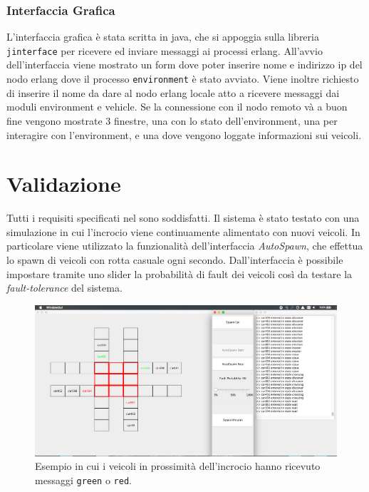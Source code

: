 \documentclass{memoir}
\begin{document}
\subsection{Interfaccia Grafica}
L'interfaccia grafica è stata scritta in java, che si appoggia sulla libreria \texttt{jinterface} per ricevere ed inviare messaggi ai processi erlang.
All'avvio dell'interfaccia viene mostrato un form dove poter inserire nome e indirizzo ip del nodo erlang dove il processo \texttt{environment} è stato avviato. Viene inoltre richiesto di inserire il nome da dare al nodo erlang locale atto a ricevere messaggi dai moduli environment e vehicle.
Se la connessione con il nodo remoto và a buon fine vengono mostrate 3 finestre, una con lo stato dell'environment, una per interagire con l'environment, e una dove vengono loggate informazioni sui veicoli.
%
%
%
%
%

\chapter{Validazione}
Tutti i requisiti specificati nel  sono soddisfatti. Il sistema è stato testato con una simulazione in cui l'incrocio viene continuamente alimentato con nuovi veicoli. In particolare viene utilizzato la funzionalità dell'interfaccia \emph{AutoSpawn}, che effettua lo spawn di veicoli con rotta casuale ogni secondo.
Dall'interfaccia è possibile impostare tramite uno slider la probabilità di fault dei veicoli così da testare la \emph{fault-tolerance} del sistema.

\begin{figure}
\centering
\includegraphics[width=\textwidth]{greenred}
\caption{Esempio in cui i veicoli in prossimità dell'incrocio hanno ricevuto messaggi \texttt{green} o \texttt{red}.}
\end{figure}
\end{document}
